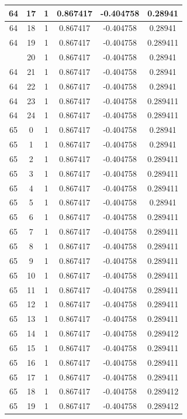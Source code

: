 \documentclass[12pt,a4paper]{article}
\numberwithin{equation}{section}
\numberwithin{figure}{section}
\numberwithin{table}{section}
\begin{document}
\begin{longtable}{|c|c|c|c|c|c|}
64 & 17 & 1 & 0.867417 & -0.404758 & 0.28941 \\ \hline
64 & 18 & 1 & 0.867417 & -0.404758 & 0.28941 \\ \hline
64 & 19 & 1 & 0.867417 & -0.404758 & 0.289411 \\ \hline
\pagebreak
64 & 20 & 1 & 0.867417 & -0.404758 & 0.28941 \\ \hline
64 & 21 & 1 & 0.867417 & -0.404758 & 0.28941 \\ \hline
64 & 22 & 1 & 0.867417 & -0.404758 & 0.28941 \\ \hline
64 & 23 & 1 & 0.867417 & -0.404758 & 0.289411 \\ \hline
64 & 24 & 1 & 0.867417 & -0.404758 & 0.289411 \\ \hline
65 & 0 & 1 & 0.867417 & -0.404758 & 0.28941 \\ \hline
65 & 1 & 1 & 0.867417 & -0.404758 & 0.28941 \\ \hline
65 & 2 & 1 & 0.867417 & -0.404758 & 0.289411 \\ \hline
65 & 3 & 1 & 0.867417 & -0.404758 & 0.289411 \\ \hline
65 & 4 & 1 & 0.867417 & -0.404758 & 0.289411 \\ \hline
65 & 5 & 1 & 0.867417 & -0.404758 & 0.28941 \\ \hline
65 & 6 & 1 & 0.867417 & -0.404758 & 0.289411 \\ \hline
65 & 7 & 1 & 0.867417 & -0.404758 & 0.289411 \\ \hline
65 & 8 & 1 & 0.867417 & -0.404758 & 0.289411 \\ \hline
65 & 9 & 1 & 0.867417 & -0.404758 & 0.289411 \\ \hline
65 & 10 & 1 & 0.867417 & -0.404758 & 0.289411 \\ \hline
65 & 11 & 1 & 0.867417 & -0.404758 & 0.289411 \\ \hline
65 & 12 & 1 & 0.867417 & -0.404758 & 0.289411 \\ \hline
65 & 13 & 1 & 0.867417 & -0.404758 & 0.289411 \\ \hline
65 & 14 & 1 & 0.867417 & -0.404758 & 0.289412 \\ \hline
65 & 15 & 1 & 0.867417 & -0.404758 & 0.289411 \\ \hline
65 & 16 & 1 & 0.867417 & -0.404758 & 0.289411 \\ \hline
65 & 17 & 1 & 0.867417 & -0.404758 & 0.289411 \\ \hline
65 & 18 & 1 & 0.867417 & -0.404758 & 0.289412 \\ \hline
65 & 19 & 1 & 0.867417 & -0.404758 & 0.289412 \\ \hline

\end{longtable}
\end{document}
